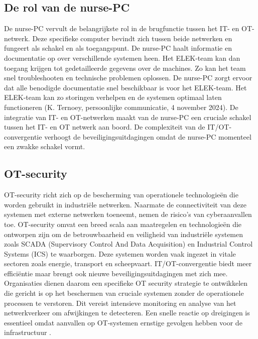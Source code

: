 \subsection{De rol van de nurse-PC} 
De nurse-PC vervult de belangrijkste rol in de brugfunctie tussen het IT- en OT-netwerk. Deze specifieke computer bevindt 
zich tussen beide netwerken en fungeert als schakel en als toegangspunt. De nurse-PC haalt informatie en documentatie op over verschillende systemen heen.
Het ELEK-team kan dan toegang krijgen tot gedetailleerde gegevens over de machines. 
Zo kan het team snel troubleshooten en technische problemen oplossen. 
De nurse-PC zorgt ervoor dat alle benodigde documentatie snel beschikbaar is voor het ELEK-team.
Het ELEK-team kan zo storingen verhelpen en de systemen optimaal laten functioneren (K. Ternoey, persoonlijke communicatie, 4 november 2024).
De integratie van IT- en OT-netwerken maakt van de nurse-PC een cruciale schakel tussen het IT- en OT netwerk aan boord.
De complexiteit van de IT/OT-convergentie verhoogt de beveiligingsuitdagingen omdat de nurse-PC momenteel een zwakke schakel vormt.

\subsection{OT-security}
OT-security richt zich op de bescherming van operationele technologieën die worden gebruikt in industriële netwerken. Naarmate de connectiviteit van deze systemen 
met externe netwerken toeneemt, nemen de risico’s van cyberaanvallen toe. OT-security omvat een breed scala aan maatregelen en technologieën die ontworpen zijn om 
de betrouwbaarheid en veiligheid van industriële systemen zoals SCADA (Supervisory Control And Data Acquisition) en Industrial Control Systems (ICS) te waarborgen. Deze systemen worden vaak ingezet in vitale 
sectoren zoals energie, transport en scheepvaart. IT/OT-convergentie biedt meer efficiëntie maar brengt ook nieuwe 
beveiligingsuitdagingen met zich mee. Organisaties dienen daarom een specifieke OT security strategie te ontwikkelen die gericht is op het beschermen van cruciale systemen 
zonder de operationele processen te verstoren. Dit vereist intensieve monitoring en analyse van het netwerkverkeer om afwijkingen te detecteren. 
Een snelle reactie op dreigingen is essentieel omdat aanvallen op OT-systemen ernstige gevolgen hebben voor de infrastructuur \autocite{Nomios2024}.

